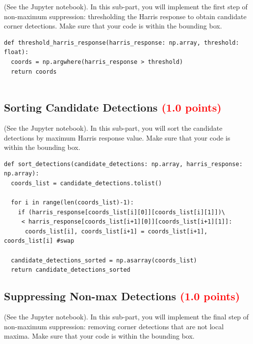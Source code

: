 \documentclass[answers]{exam}
\newcommand{\mypoints}[1]{\textcolor{red}{(#1 points)}}
\begin{document}
(See the Jupyter notebook). In this sub-part, you will implement the first step of non-maximum suppression: thresholding the Harris response to obtain candidate corner detections. Make sure that your code is within the bounding box.

\begin{solution}
\begin{verbatim}
def threshold_harris_response(harris_response: np.array, threshold: float):
  coords = np.argwhere(harris_response > threshold)
  return coords
  
\end{verbatim}
\end{solution}

\subsection{Sorting Candidate Detections \mypoints{1.0}}
(See the Jupyter notebook). In this sub-part, you will sort the candidate detections by maximum Harris response value. Make sure that your code is within the bounding box.

\begin{solution}
\begin{verbatim}
def sort_detections(candidate_detections: np.array, harris_response: np.array):
  coords_list = candidate_detections.tolist()
  
  for i in range(len(coords_list)-1):
    if (harris_response[coords_list[i][0]][coords_list[i][1]])\
     < harris_response[coords_list[i+1][0]][coords_list[i+1][1]]:
      coords_list[i], coords_list[i+1] = coords_list[i+1], coords_list[i] #swap

  candidate_detections_sorted = np.asarray(coords_list)
  return candidate_detections_sorted 
\end{verbatim}
\end{solution}

\subsection{Suppressing Non-max Detections \mypoints{1.0}}
(See the Jupyter notebook). In this sub-part, you will implement the final step of non-maximum suppression: removing corner detections that are not local maxima. Make sure that your code is within the bounding box.
\end{document}
